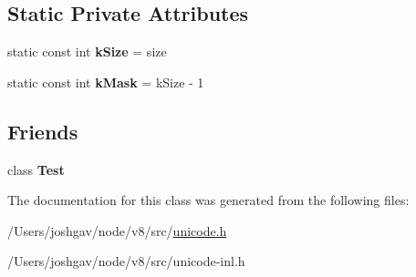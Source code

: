 \subsection*{Static Private Attributes}
\begin{DoxyCompactItemize}
\item 
static const int {\bfseries k\+Size} = size\hypertarget{classunibrow_1_1_mapping_a9574791e1ef6d83140319a465ba1ad60}{}\label{classunibrow_1_1_mapping_a9574791e1ef6d83140319a465ba1ad60}

\item 
static const int {\bfseries k\+Mask} = k\+Size -\/ 1\hypertarget{classunibrow_1_1_mapping_a618976d332a96d571dc343929b83c774}{}\label{classunibrow_1_1_mapping_a618976d332a96d571dc343929b83c774}

\end{DoxyCompactItemize}
\subsection*{Friends}
\begin{DoxyCompactItemize}
\item 
class {\bfseries Test}\hypertarget{classunibrow_1_1_mapping_a5b78b1c2e1fa07ffed92da365593eaa4}{}\label{classunibrow_1_1_mapping_a5b78b1c2e1fa07ffed92da365593eaa4}

\end{DoxyCompactItemize}


The documentation for this class was generated from the following files\+:\begin{DoxyCompactItemize}
\item 
/\+Users/joshgav/node/v8/src/\hyperlink{unicode_8h}{unicode.\+h}\item 
/\+Users/joshgav/node/v8/src/unicode-\/inl.\+h\end{DoxyCompactItemize}
